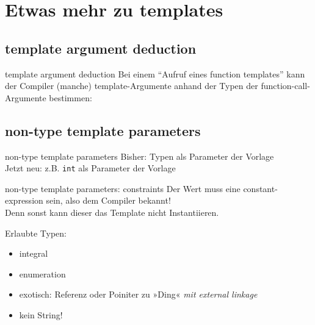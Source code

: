\section{Etwas mehr zu templates}


\subsection{template argument deduction}

\begin{frame}[t]{template argument deduction}
	Bei einem \enquote{Aufruf eines function templates} kann der Compiler (manche) template-Argumente anhand der Typen der function-call-Argumente bestimmen:
	
	\onslide*<+> {  }
	\onslide<+-> {  }
\end{frame}


\subsection{non-type template parameters}

\begin{frame}[t]{non-type template parameters}
	Bisher: Typen als Parameter der Vorlage\\
	\onslide<2> { Jetzt neu: z.B. \texttt{int} als Parameter der Vorlage }
	
	 {  }
	\onslide<2> {  }
\end{frame}

\begin{frame}{non-type template parameters: constraints}
	Der Wert muss eine constant-expression sein, also dem Compiler bekannt!	\\
	Denn sonst kann dieser das Template nicht Instantiieren.
	
	\vspace{2em}
	
	Erlaubte Typen:
	\begin{itemize}
		\item integral
		\item enumeration
		\item exotisch: Referenz oder Poiniter zu »Ding« \emph{mit external linkage}
		\item kein String!
	\end{itemize}
\end{frame}
